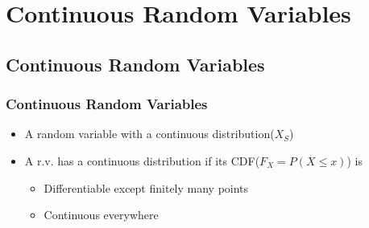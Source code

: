 \section{Continuous Random Variables}

\subsection{Continuous Random Variables}

\subsubsection*{Continuous Random Variables}
\begin{itemize}
    \item A random variable with a continuous distribution($X_S$)
    \item A r.v. has a continuous distribution if its CDF($F_X=P(X\leq x)$) is
    \begin{itemize}
        \item Differentiable except finitely many points
        \item Continuous everywhere
    \end{itemize}
\end{itemize}

